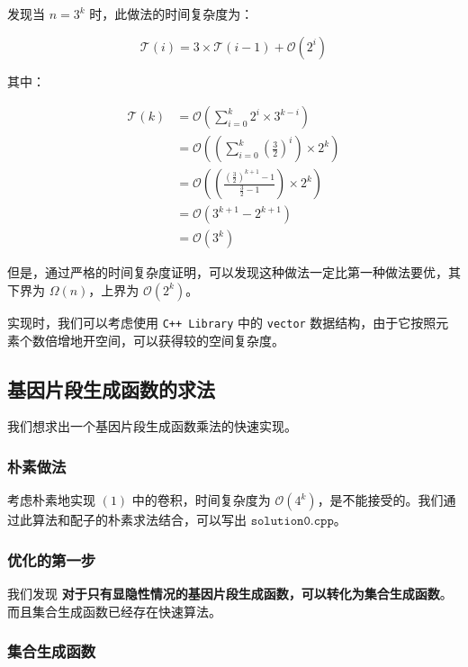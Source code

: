 \documentclass[12pt]{article} %
\begin{document}
\newpage

发现当 $n=3^k$ 时，此做法的时间复杂度为：

$$\mathcal T(i)=3 \times \mathcal T(i-1) + \mathcal O(2^i)$$

其中：

$$
\begin{aligned}
    \mathcal T(k) &= \mathcal O\left(\sum_{i=0}^k 2^i \times 3^{k-i} \right) \\
                  &= \mathcal O\left( \left (\sum_{i=0}^k (\frac{3}{2})^i \right) \times 2^k \right) \\
                  &= \mathcal O\left( \left(\frac{\left(\frac{3}{2}\right)^{k+1}-1}{\frac{3}{2}-1}\right) \times 2^k\right) \\
                  &= \mathcal O(3^{k+1} - 2^{k+1}) \\
                  &= \mathcal O(3^k)
\end{aligned}
$$

但是，通过严格的时间复杂度证明，可以发现这种做法一定比第一种做法要优，其下界为 $\Omega(n)$，上界为 $\mathcal O(2^k)$。

实现时，我们可以考虑使用 \texttt{C++ Library} 中的 \texttt{vector} 数据结构，由于它按照元素个数倍增地开空间，可以获得较的空间复杂度。

\newpage

\subsection{基因片段生成函数的求法}

我们想求出一个基因片段生成函数乘法的快速实现。

\subsubsection*{朴素做法}

考虑朴素地实现 $(1)$ 中的卷积，时间复杂度为 $\mathcal O(4^k)$，是不能接受的。我们通过此算法和配子的朴素求法结合，可以写出 $\texttt{solution0.cpp}$。

\subsubsection*{优化的第一步}

我们发现 \textbf{对于只有显隐性情况的基因片段生成函数，可以转化为集合生成函数}。而且集合生成函数已经存在快速算法。

\subsubsection*{集合生成函数}
\end{document}
